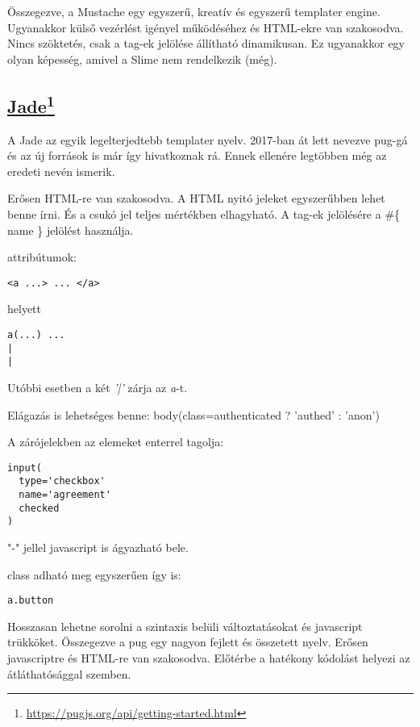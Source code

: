 Összegezve, a Mustache egy egyszerű, kreatív és egyszerű templater engine.
Ugyanakkor külső vezérlést igényel működéséhez és HTML-ekre van szakosodva.
Nincs szöktetés, csak a tag-ek jelölése állítható dinamikusan.
Ez ugyanakkor egy olyan képesség, amivel a Slime nem rendelkezik (még). 



\subsection[Jade]{\href{https://pugjs.org/api/getting-started.html}{Jade}\footnote{\url{https://pugjs.org/api/getting-started.html}}}
\label{sec:jade}
A Jade az egyik legelterjedtebb templater nyelv.
2017-ban át lett nevezve pug-gá és az új források is már így hivatkoznak rá.
Ennek ellenére legtöbben még az eredeti nevén ismerik.

Erősen HTML-re van szakosodva.
A HTML nyitó jeleket egyszerűbben lehet benne írni.
És a csukó jel teljes mértékben elhagyható.
A tag-ek jelölésére a \#\{ name \} jelölést használja.

attribútumok:
\begin{verbatim}
<a ...> ... </a> 
\end{verbatim}
helyett 
\begin{verbatim}
a(...) ...
|
|
\end{verbatim}
Utóbbi esetben a két \textit{'|'} zárja az \textit{a}-t.

Elágazás is lehetséges benne: body(class=authenticated ? 'authed' : 'anon')

A zárójelekben az elemeket enterrel tagolja:
\begin{verbatim}
input(
  type='checkbox'
  name='agreement'
  checked
)
\end{verbatim}

"-" jellel javascript is ágyazható bele.

class adható meg egyszerűen így is:
\begin{verbatim}
a.button
\end{verbatim}

Hosszasan lehetne sorolni a szintaxis belüli változtatásokat és javascript trükköket.
Összegezve a pug egy nagyon fejlett és összetett nyelv.
Erősen javascriptre és HTML-re van szakosodva.
Előtérbe a hatékony kódolást helyezi az átláthatósággal szemben.


